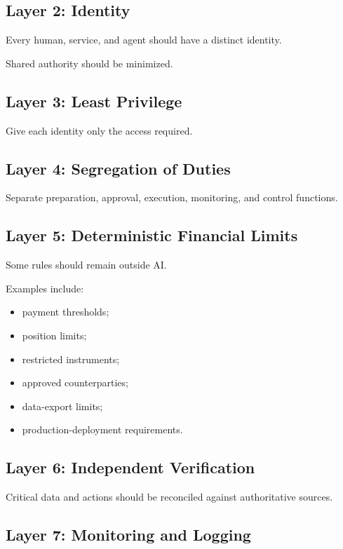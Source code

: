 \subsection{Layer 2: Identity}

Every human, service, and agent should have a distinct identity.

Shared authority should be minimized.

\subsection{Layer 3: Least Privilege}

Give each identity only the access required.

\subsection{Layer 4: Segregation of Duties}

Separate preparation, approval, execution, monitoring, and control functions.

\subsection{Layer 5: Deterministic Financial Limits}

Some rules should remain outside AI.

Examples include:

\begin{itemize}
    \item payment thresholds;
    \item position limits;
    \item restricted instruments;
    \item approved counterparties;
    \item data-export limits;
    \item production-deployment requirements.
\end{itemize}

\subsection{Layer 6: Independent Verification}

Critical data and actions should be reconciled against authoritative sources.

\subsection{Layer 7: Monitoring and Logging}

